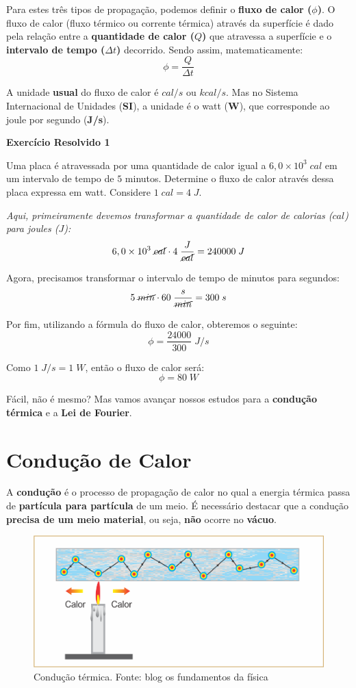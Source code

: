 \documentclass[12pt,twoside]{article}
\newenvironment{resposta*}
{\bf Resposta:\\ }
{}
\begin{document}
Para estes três tipos de propagação, podemos definir o \textbf{fluxo de calor ($\phi$)}. O fluxo de calor (fluxo térmico ou corrente térmica) através da superfície é dado pela relação entre a \textbf{quantidade de calor ($Q$)} que atravessa a superfície e o \textbf{intervalo de tempo ($\Delta t$)} decorrido. Sendo assim, matematicamente: \[\phi=\dfrac{Q}{\Delta t}\]


A unidade \textbf{usual} do fluxo de calor é \textbf{$cal/s$} ou \textbf{$kcal/s$}. Mas no Sistema Internacional de Unidades (\textbf{SI}), a unidade é o watt (\textbf{W}), que corresponde ao joule por segundo (\textbf{J/s}).


\textbf{Exercício Resolvido 1}


Uma placa é atravessada por uma quantidade de calor igual a $6,0\times 10^{3}\;cal$ em um intervalo de tempo de $5$ minutos. Determine o fluxo de calor através dessa placa expressa em watt. Considere $1\;cal=4\;J$.


\begin{resposta*}
{\it Aqui, primeiramente devemos transformar a quantidade de calor de calorias ($cal$) para joules ($J$): \[6,0\times 10^{3}\;\cancel{cal} \cdot 4\;\frac{J}{\cancel{cal}} = 240000\;J\]

Agora, precisamos transformar o intervalo de tempo de minutos para segundos: \[5\;\cancel{min}\cdot 60\;\frac{s}{\cancel{min}} = 300\;s\]

Por fim, utilizando a fórmula do fluxo de calor, obteremos o seguinte: \[\phi = \dfrac{24000}{300}\;J/s\]

Como $1\;J/s=1\;W$, então o fluxo de calor será: \[\boxed{\phi = 80\;W}\]}
\end{resposta*}

Fácil, não é mesmo? Mas vamos avançar nossos estudos para a \textbf{condução térmica} e a \textbf{Lei de Fourier}.


\hypertarget{x-condução-de-calor}{\section{Condução de Calor}}
A \textbf{condução} é o processo de propagação de calor no qual a energia térmica passa de \textbf{partícula para partícula} de um meio. É necessário destacar que a condução \textbf{precisa de um meio material}, ou seja, \textbf{não} ocorre no \textbf{vácuo}.


\begin{figure}[ht]{}
\centering\includegraphics[width=2.5truein]{conducao.png}
\caption{Condução térmica. Fonte: blog os fundamentos da física}

\end{figure}
\end{document}
